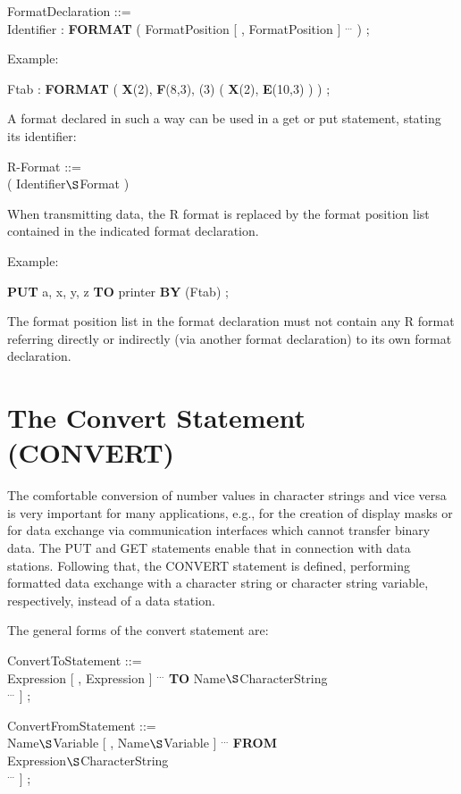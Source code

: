 FormatDeclaration ::=\\
\x Identifier : {\bf FORMAT} ( FormatPosition [ , FormatPosition ] $^{...}$ ) ;

Example:

Ftab : {\bf FORMAT} ( {\bf X}(2), {\bf F}(8,3), (3) ( {\bf X}(2), {\bf E}(10,3) ) ) ;

A format declared in such a way can be used in a get or put statement,
stating its identifier:

R-Format ::=\\
 ( Identifier$\S $Format )

When transmitting data, the R format is replaced by the format position
list contained in the indicated format declaration.

Example:

{\bf PUT} a, x, y, z {\bf TO} printer {\bf BY }(Ftab) ;

The format position list in the format declaration must not contain any
R format referring directly or indirectly (via another format
declaration) to its own format declaration.

\section{The Convert Statement (CONVERT)}   %
\label{sec_convert}

The comfortable conversion of number values in character strings and
vice versa is very important for many applications, e.g., for the
creation of display masks or for data exchange via communication
interfaces which cannot transfer binary data. The PUT and GET
statements enable that in connection with data stations. Following
that, the CONVERT statement is defined, performing formatted data
exchange with a character string or character string variable,
respectively, instead of a data station.

The general forms of the convert statement are:

ConvertToStatement ::=\\
 Expression [ , Expression ] $^{...}$ {\bf TO} Name$\S $CharacterString\\
\x [ {\bf BY} FormatPositionConvert [ FormatPositionConvert ] $^{...}$ ] ;

ConvertFromStatement ::=\\
 Name$\S $Variable [ , Name$\S $Variable ] $^{...}$ {\bf FROM}\\
Expression$\S $CharacterString\\
\x [ {\bf BY} FormatPositionConvert [ , FormatPositionConvert ] $^{...}$ ] ;

